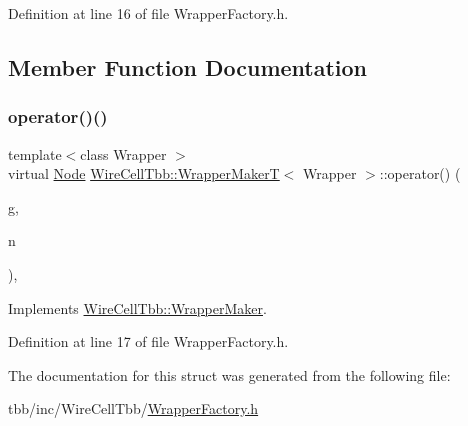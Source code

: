 Definition at line 16 of file Wrapper\+Factory.\+h.



\subsection{Member Function Documentation}
\mbox{\label{struct_wire_cell_tbb_1_1_wrapper_maker_t_a582bbbeb058f68e79dd61c8c539e2718}} 
\subsubsection{\texorpdfstring{operator()()}{operator()()}}
{\footnotesize\ttfamily template$<$class Wrapper $>$ \\
virtual \hyperlink{namespace_wire_cell_tbb_aa7b6ff37a20e0174babf0614286bb59f}{Node} \hyperlink{struct_wire_cell_tbb_1_1_wrapper_maker_t}{Wire\+Cell\+Tbb\+::\+Wrapper\+MakerT}$<$ Wrapper $>$\+::operator() (\begin{DoxyParamCaption}\item[{tbb\+::flow\+::graph \&}]{g,  }\item[{\hyperlink{class_wire_cell_1_1_interface_a09c548fb8266cfa39afb2e74a4615c37}{Wire\+Cell\+::\+I\+Node\+::pointer}}]{n }\end{DoxyParamCaption})\hspace{0.3cm}{\ttfamily [inline]}, {\ttfamily [virtual]}}



Implements \hyperlink{struct_wire_cell_tbb_1_1_wrapper_maker_a65fa28063bf58c1358a2fc602d42cb42}{Wire\+Cell\+Tbb\+::\+Wrapper\+Maker}.



Definition at line 17 of file Wrapper\+Factory.\+h.



The documentation for this struct was generated from the following file\+:\begin{DoxyCompactItemize}
\item 
tbb/inc/\+Wire\+Cell\+Tbb/\hyperlink{_wrapper_factory_8h}{Wrapper\+Factory.\+h}\end{DoxyCompactItemize}
